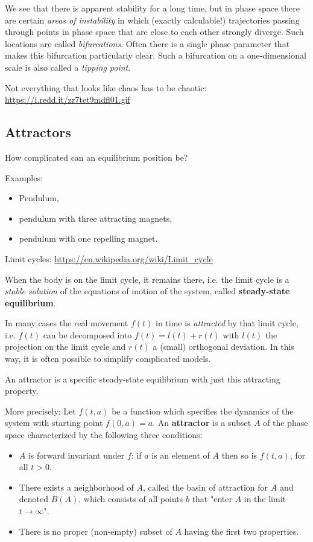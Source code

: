 \documentclass[11pt,a4paper]{article}
\begin{document}
We see that there is apparent stability for a long time, but in phase space
there are certain \emph{areas of instability} in which (exactly calculable!)
trajectories passing through points in phase space that are close to each
other strongly diverge. Such locations are called \emph{bifurcations}.  Often
there is a single phase parameter that makes this bifurcation particularly
clear. Such a bifurcation on a one-dimensional scale is also called a
\emph{tipping point}.

Not everything that looks like chaos has to be chaotic:\\
\url{https://i.redd.it/zr7tet9mdfl01.gif}

\subsection{Attractors}

How complicated can an equilibrium position be? 

Examples: 
\begin{itemize}
\item Pendulum,
\item pendulum with three attracting magnets,
\item pendulum with one repelling magnet.
\end{itemize}

Limit cycles: \url{https://en.wikipedia.org/wiki/Limit_cycle}

When the body is on the limit cycle, it remains there, i.e. the limit cycle is
a \emph{stable solution} of the equations of motion of the system, called
\textbf{steady-state equilibrium}.
    
In many cases the real movement $f(t)$ in time is \emph{attracted} by that
limit cycle, i.e. $f(t)$ can be decomposed into $f(t)=l(t)+r(t)$ with $l(t)$
the projection on the limit cycle and $r(t)$ a (small) orthogonal deviation.
In this way, it is often possible to simplify complicated models.

An attractor is a specific steady-state equilibrium with just this attracting
property.

More precisely: Let $f(t,a)$ be a function which specifies the dynamics of the
system with starting point $f(0,a)=a$. An \textbf{attractor} is a subset $A$
of the phase space characterized by the following three conditions:
\begin{itemize}
\item $A$ is forward invariant under $f$: if $a$ is an element of $A$ then so
  is $f(t,a)$, for all $t > 0$.  
\item There exists a neighborhood of $A$, called the basin of attraction for $A$
  and denoted $B(A)$, which consists of all points $b$ that "enter $A$ in the limit
  $t\to\infty$". 
\item There is no proper (non-empty) subset of $A$ having the first two
  properties.
\end{itemize}
\end{document}
